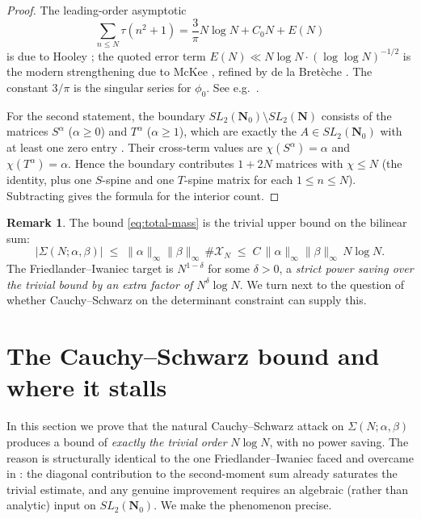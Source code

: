 \documentclass[11pt]{article}
\theoremstyle{definition}
\newtheorem{remark}[theorem]{Remark}
\newcommand{\N}{\mathbf{N}}
\newcommand{\Nz}{\mathbf{N}_0}
\newcommand{\SLNz}{SL_2(\Nz)}
\newcommand{\SLN}{SL_2(\N)}
\begin{document}
\begin{proof}
The leading-order asymptotic
\[
\sum_{n\le N}\tau(n^{2}+1)=\frac{3}{\pi}N\log N+C_{0}N+E(N)
\]
is due to Hooley \cite{hooley63}; the quoted error term
$E(N)\ll N\log N\cdot(\log\log N)^{-1/2}$ is the modern strengthening due
to McKee \cite{mckee99}, refined by de la Bretèche
\cite{delabreteche-tenenbaum}. The constant $3/\pi$ is the singular
series for $\phi_{0}$. See e.g.\ \cite[Cor.\ 1.1]{mckee99}.

For the second statement, the boundary $\SLNz\setminus\SLN$ consists of
the matrices $S^{\alpha}$ ($\alpha\ge 0$) and $T^{\alpha}$ ($\alpha\ge 1$),
which are exactly the $A\in\SLNz$ with at least one zero entry
\cite[Rem.~1.4]{shakov}. Their cross-term values are $\chi(S^{\alpha})=\alpha$ and
$\chi(T^{\alpha})=\alpha$. Hence the boundary contributes $1+2N$ matrices
with $\chi\le N$ (the identity, plus one $S$-spine and one $T$-spine
matrix for each $1\le n\le N$). Subtracting gives the formula for the
interior count.
\end{proof}

\begin{remark}\label{rem:trivial-is-N-log-N}
The bound \eqref{eq:total-mass} is the trivial upper bound on the
bilinear sum:
\[
|\Sigma(N;\alpha,\beta)|\;\le\;\|\alpha\|_{\infty}\|\beta\|_{\infty}\,
\#\mathcal{X}_{N}\;\le\;C\,\|\alpha\|_{\infty}\|\beta\|_{\infty}\,N\log N.
\]
The Friedlander--Iwaniec target is $N^{1-\delta}$ for some $\delta>0$, a
\emph{strict power saving over the trivial bound by an extra factor of
$N^{\delta}\log N$}. We turn next to the question of whether
Cauchy--Schwarz on the determinant constraint can supply this.
\end{remark}

\section{The Cauchy--Schwarz bound and where it stalls}\label{sec:CS}

In this section we prove that the natural Cauchy--Schwarz attack on
$\Sigma(N;\alpha,\beta)$ produces a bound of \emph{exactly the trivial
order} $N\log N$, with no power saving. The reason is structurally
identical to the one Friedlander--Iwaniec faced and overcame in
\cite{FI98b}: the diagonal contribution to the second-moment sum already
saturates the trivial estimate, and any genuine improvement requires an
algebraic (rather than analytic) input on $\SLNz$. We make the
phenomenon precise.
\end{document}
